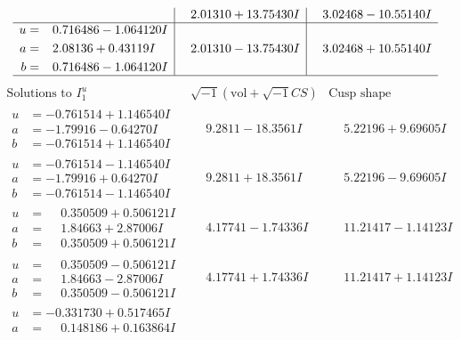 \documentclass[1p]{elsarticle_modified}
\theoremstyle{definition}
\newcommand{\I}{\sqrt{-1}}
\begin{document}
$$\begin{array}{c|c|c}
 & \phantom{-}2.01310 + 13.75430 I & \phantom{-}3.02468 - 10.55140 I \\ \hline\begin{aligned}
u &= \phantom{-}0.716486 - 1.064120 I \\
a &= \phantom{-}2.08136 + 0.43119 I \\
b &= \phantom{-}0.716486 - 1.064120 I\end{aligned}
 & \phantom{-}2.01310 - 13.75430 I & \phantom{-}3.02468 + 10.55140 I\\
 \hline 
 \end{array}$$\newpage$$\begin{array}{c|c|c}  
\text{Solutions to }I^u_{1}& \I (\text{vol} + \sqrt{-1}CS) & \text{Cusp shape}\\
 \hline 
\begin{aligned}
u &= -0.761514 + 1.146540 I \\
a &= -1.79916 - 0.64270 I \\
b &= -0.761514 + 1.146540 I\end{aligned}
 & \phantom{-}9.2811 - 18.3561 I & \phantom{-}5.22196 + 9.69605 I \\ \hline\begin{aligned}
u &= -0.761514 - 1.146540 I \\
a &= -1.79916 + 0.64270 I \\
b &= -0.761514 - 1.146540 I\end{aligned}
 & \phantom{-}9.2811 + 18.3561 I & \phantom{-}5.22196 - 9.69605 I \\ \hline\begin{aligned}
u &= \phantom{-}0.350509 + 0.506121 I \\
a &= \phantom{-}1.84663 + 2.87006 I \\
b &= \phantom{-}0.350509 + 0.506121 I\end{aligned}
 & \phantom{-}4.17741 - 1.74336 I & \phantom{-}11.21417 - 1.14123 I \\ \hline\begin{aligned}
u &= \phantom{-}0.350509 - 0.506121 I \\
a &= \phantom{-}1.84663 - 2.87006 I \\
b &= \phantom{-}0.350509 - 0.506121 I\end{aligned}
 & \phantom{-}4.17741 + 1.74336 I & \phantom{-}11.21417 + 1.14123 I \\ \hline\begin{aligned}
u &= -0.331730 + 0.517465 I \\
a &= \phantom{-}0.148186 + 0.163864 I \\

\end{aligned}
\end{array}$$
\end{document}
